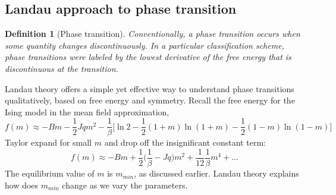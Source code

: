 \documentclass[a4paper]{article}
\theoremstyle{new}
\newtheorem{defi}{Definition}[section]
\begin{document}
\subsection{Landau approach to phase transition}
\begin{defi}[Phase transition]
Conventionally, a phase transition occurs when some quantity changes discontinuously. In a particular classification scheme, phase transitions were labeled by the lowest derivative of the free energy that is discontinuous at the transition.
\end{defi}
Landau theory offers a simple yet effective way to understand phase transitions qualitatively, based on free energy and symmetry. Recall the free energy for the Ising model in the mean field approximation, 
$$f(m)\approx-Bm-\frac{1}{2}Jqm^2-\frac{1}{\beta}\bigg[\ln2-\frac{1}{2}(1+m)\ln(1+m)-\frac{1}{2}(1-m)\ln(1-m)\bigg]$$
Taylor expand for small $m$ and drop off the insignificant constant term:
$$f(m)\approx-Bm+\frac{1}{2}\bigg(\frac{1}{\beta}-Jq\bigg)m^2+\frac{1}{12}\frac{1}{\beta}m^4+\dots$$
The equilibrium value of $m$ is $m_{min}$, as discussed earlier. Landau theory explains how does $m_{min}$ change as we vary the parameters.
\end{document}
